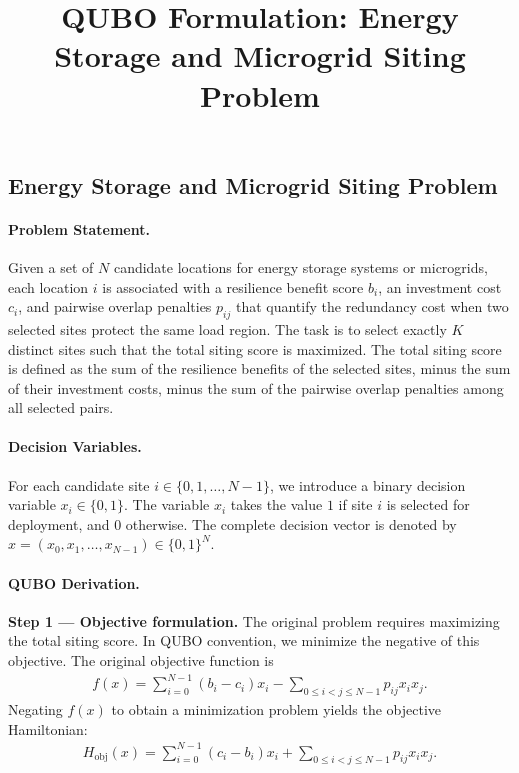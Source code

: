 \documentclass[12pt]{article}
\title{QUBO Formulation: Energy Storage and Microgrid Siting Problem}
\date{}
\begin{document}
\maketitle

\subsection*{Energy Storage and Microgrid Siting Problem}

\paragraph{Problem Statement.}
Given a set of $N$ candidate locations for energy storage systems or microgrids, each location $i$ is associated with a resilience benefit score $b_i$, an investment cost $c_i$, and pairwise overlap penalties $p_{ij}$ that quantify the redundancy cost when two selected sites protect the same load region. The task is to select exactly $K$ distinct sites such that the total siting score is maximized. The total siting score is defined as the sum of the resilience benefits of the selected sites, minus the sum of their investment costs, minus the sum of the pairwise overlap penalties among all selected pairs.

\paragraph{Decision Variables.}
For each candidate site $i \in \{0, 1, \dots, N-1\}$, we introduce a binary decision variable $x_i \in \{0, 1\}$. The variable $x_i$ takes the value $1$ if site $i$ is selected for deployment, and $0$ otherwise. The complete decision vector is denoted by $x = (x_0, x_1, \dots, x_{N-1}) \in \{0, 1\}^N$.

\paragraph{QUBO Derivation.}
\textbf{Step 1 --- Objective formulation.} The original problem requires maximizing the total siting score. In QUBO convention, we minimize the negative of this objective. The original objective function is
\begin{align}
    f(x) = \sum_{i=0}^{N-1} (b_i - c_i) x_i - \sum_{0 \le i < j \le N-1} p_{ij} x_i x_j.
\end{align}
Negating $f(x)$ to obtain a minimization problem yields the objective Hamiltonian:
\begin{align}
    H_{\text{obj}}(x) = \sum_{i=0}^{N-1} (c_i - b_i) x_i + \sum_{0 \le i < j \le N-1} p_{ij} x_i x_j.
\end{align}
\end{document}
